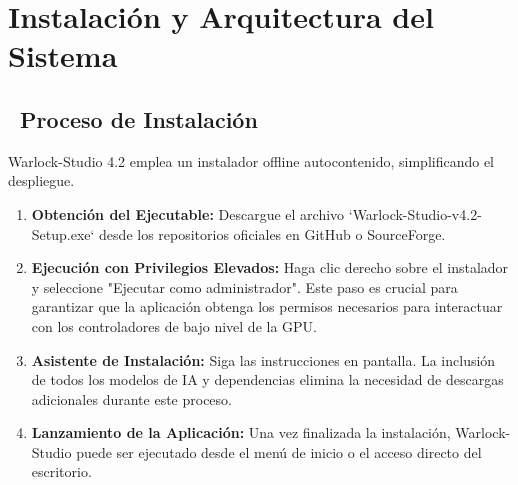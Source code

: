\documentclass[11pt, a4paper]{article}
\begin{document}
\section{Instalación y Arquitectura del Sistema}
\subsection{\faDownload\ Proceso de Instalación}
Warlock-Studio 4.2 emplea un instalador offline autocontenido, simplificando el despliegue.
\begin{enumerate}[leftmargin=*]
    \item \textbf{Obtención del Ejecutable:} Descargue el archivo `Warlock-Studio-v4.2-Setup.exe` desde los repositorios oficiales en GitHub o SourceForge.
    \item \textbf{Ejecución con Privilegios Elevados:} Haga clic derecho sobre el instalador y seleccione "Ejecutar como administrador". Este paso es crucial para garantizar que la aplicación obtenga los permisos necesarios para interactuar con los controladores de bajo nivel de la GPU.
    \item \textbf{Asistente de Instalación:} Siga las instrucciones en pantalla. La inclusión de todos los modelos de IA y dependencias elimina la necesidad de descargas adicionales durante este proceso.
    \item \textbf{Lanzamiento de la Aplicación:} Una vez finalizada la instalación, Warlock-Studio puede ser ejecutado desde el menú de inicio o el acceso directo del escritorio.
\end{enumerate}
\end{document}
